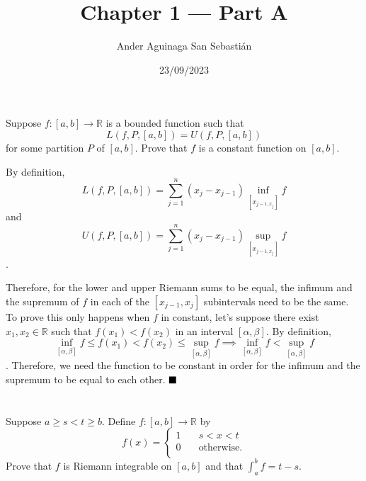 \documentclass[11pt, a4paper, tikz]{article}
\newcommand{\newpara}{
	\vskip 2mm
}
\newcommand{\centsection}[1]{
	\section*{\centering{#1}}
}
\renewcommand{\qed}{\hfill\blacksquare}
\newcommand{\reals}{
	\ensuremath{\mathbb{R}}
}
\begin{document}
	\title{\textbf{Chapter 1 — Part A}}
	\author{Ander Aguinaga San Sebastián}
	\date{23/09/2023}
	\maketitle
	\centsection{Exercise 1}
	
	\begin{formulationBox}
		Suppose $f:[a,b]\rightarrow\reals$ is a bounded function such that \[L(f,P,[a,b]) = U(f,P,[a,b])\] for some partition $P$ of $[a,b]$. Prove that $f$ is a constant function on $[a,b]$.
	\end{formulationBox}
	
	By definition,
	\begin{equation*}
		L(f, P, [a, b]) = \sum_{j=1}^{n}(x_j-x_{j-1})\inf_{[x_{j-1,x_j}]}f
	\end{equation*}
	and
		\begin{equation*}
		U(f, P, [a, b]) = \sum_{j=1}^{n}(x_j-x_{j-1})\sup_{[x_{j-1,x_j}]}f
	\end{equation*}
	.
	\newpara
	Therefore, for the lower and upper Riemann sums to be equal, the infimum and the supremum of $f$ in each of the $[x_{j-1},x_j]$ subintervals need to be the same. To prove this only happens when $f$ in constant, let's suppose there exist $x_1, x_2\in\reals$ such that $f(x_1) < f(x_2)$ in an interval $[\alpha,\beta]$. By definition,
	\begin{equation*}
		\inf_{[\alpha,\beta]}f \leq f(x_1) < f(x_2) \leq  \sup_{[\alpha,\beta]}f \implies \inf_{[\alpha,\beta]}f < \sup_{[\alpha,\beta]}f
	\end{equation*}. Therefore, we need the function to be constant in order for the infimum and the supremum to be equal to each other.
	$\qed$
	
	\centsection{Exercise 2}
	
	\begin{formulationBox}
		Suppose $a\geq s<t\geq b$. Define $f:[a,b]\rightarrow\reals$ by
		\[
			f(x) =
			\begin{cases}
				1 &\quad s<x<t\\
				0 &\quad \textrm{otherwise.}\\ 
			\end{cases}
		\]
		Prove that $f$ is Riemann integrable on $[a,b]$ and that $\int_a^bf=t-s$.
	\end{formulationBox}
	
\end{document}
